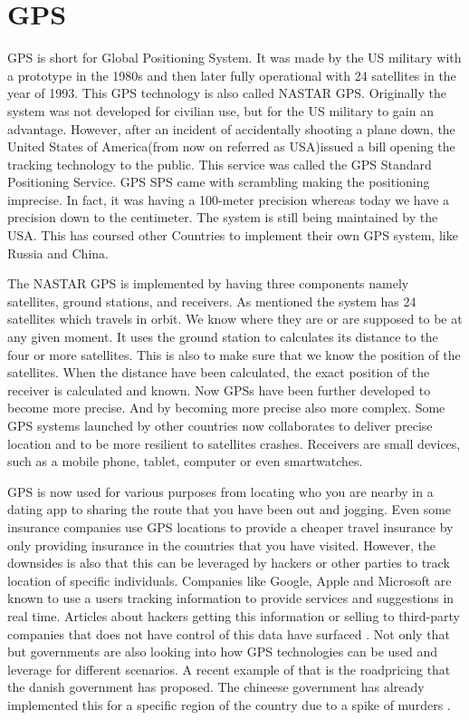 \section{GPS}
GPS is short for Global Positioning System. It was made by the US military with a prototype in the 1980s and then later fully operational with 24 satellites in the year of 1993. This GPS technology is also called NASTAR GPS. Originally the system was not developed for civilian use, but for the US military to gain an advantage. However, after an incident of accidentally shooting a plane down, the United States of America(from now on referred as USA)issued a bill opening the tracking technology to the public. This service was called the GPS Standard Positioning Service. GPS SPS came with scrambling making the positioning imprecise. In fact, it was having a 100-meter precision whereas today we have a precision down to the centimeter. The system is still being maintained by the USA. This has coursed other Countries to implement their own GPS system, like Russia and China.

The NASTAR GPS is implemented by having three components namely satellites, ground stations, and receivers. As mentioned the system has 24 satellites which travels in orbit. We know where they are or are supposed to be at any given moment. It uses the ground station to calculates its distance to the four or more satellites. This is also to make sure that we know the position of the satellites. When the distance have been calculated, the exact position of the receiver is calculated and known. Now GPSs have been further developed to become more precise. And by becoming more precise also more complex. Some GPS systems launched by other countries now collaborates to deliver precise location and to be more resilient to satellites crashes.
Receivers are small devices, such as a mobile phone, tablet, computer or even smartwatches. 

GPS is now used for various purposes from locating who you are nearby in a dating app to sharing the route that you have been out and jogging. Even some insurance companies use GPS locations to provide a cheaper travel insurance by only providing insurance in the countries that you have visited. However, the downsides is also that this can be leveraged by hackers or other parties to track location of specific individuals. Companies like Google, Apple and Microsoft are known to use a users tracking information to provide services and suggestions in real time. Articles about hackers getting this information or selling to third-party companies that does not have control of this data  have surfaced . Not only that but governments are also looking into how GPS technologies can be used and leverage for different scenarios. A recent example of that is the roadpricing that the danish government has proposed. The chineese government has already implemented this for a specific region of the country due to a spike of murders \cite{guardian:2017}.